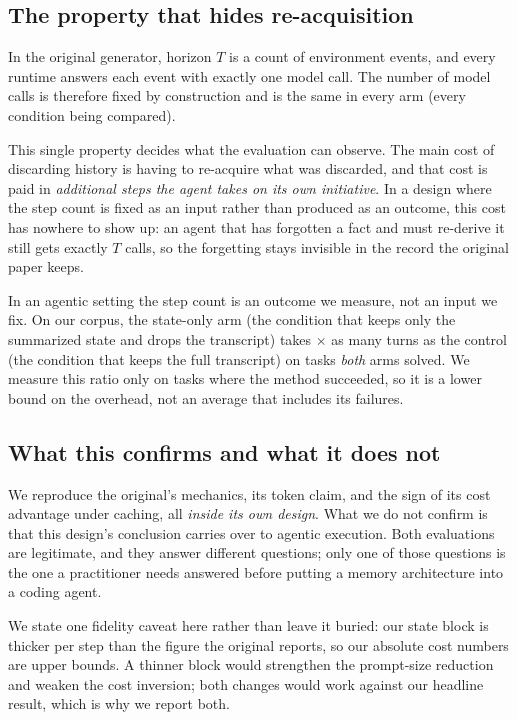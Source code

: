 \subsection{The property that hides re-acquisition}

In the original generator, horizon $T$ is a count of environment events, and
every runtime answers each event with exactly one model call\origin. The
number of model calls is therefore fixed by construction and is the same in
every arm (every condition being compared).

This single property decides what the evaluation can observe. The main cost
of discarding history is having to re-acquire what was discarded, and that
cost is paid in \emph{additional steps the agent takes on its own
initiative}. In a design where the step count is fixed as an input rather
than produced as an outcome, this cost has nowhere to show up: an agent that
has forgotten a fact and must re-derive it still gets exactly $T$ calls, so
the forgetting stays invisible in the record the original paper keeps.

In an agentic setting the step count is an outcome we measure, not an input
we fix. On our corpus, the state-only arm (the condition that keeps only the
summarized state and drops the transcript) takes \TurnRatioTailZero$\times$
as many turns as the control (the condition that keeps the full transcript)
on tasks \emph{both} arms solved\live. We measure this ratio only on tasks
where the method succeeded, so it is a lower bound on the overhead, not an
average that includes its failures.

\subsection{What this confirms and what it does not}

We reproduce the original's mechanics, its token claim, and the sign of its
cost advantage under caching, all \emph{inside its own design}. What we do
not confirm is that this design's conclusion carries over to agentic
execution. Both evaluations are legitimate, and they answer different
questions; only one of those questions is the one a practitioner needs
answered before putting a memory architecture into a coding agent.

We state one fidelity caveat here rather than leave it buried: our state
block is thicker per step than the figure the original reports\live, so our
absolute cost numbers are upper bounds. A thinner block would strengthen the
prompt-size reduction and weaken the cost inversion; both changes would work
against our headline result, which is why we report both.
